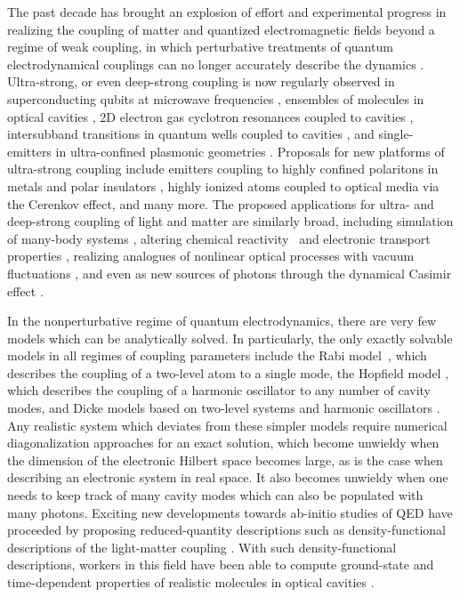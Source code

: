 \documentclass[aps,prl,twocolumn,
	groupedaddress,superscriptaddress,
	amsfonts,amssymb,amsmath,floatfix,
	citeautoscript]{revtex4-1}
\begin{document}
The past decade has brought an explosion of effort and experimental progress in realizing the coupling of matter and quantized electromagnetic fields beyond a regime of weak coupling, in which perturbative treatments of quantum electrodynamical couplings can no longer accurately describe the dynamics \cite{flick7strong,ruggenthaler2017b,forn2018ultrastrong,kockum2018ultrastrong}. Ultra-strong, or even deep-strong coupling is now regularly observed in superconducting qubits at microwave frequencies \cite{blais2004,wallraff2004,yoshihara2017superconducting,forn2017ultrastrong}, ensembles of molecules in optical cavities \cite{hutchison2012,hutchison2013,coles2014,coles2014b,shalabney2015coherent, thomas2016,ebbesen2016}, 2D electron gas cyclotron resonances coupled to cavities \cite{hagenmuller2010ultrastrong,scalari2012ultrastrong,zhang2016collective}, intersubband transitions in quantum wells coupled to cavities \cite{todorov2010ultrastrong,geiser2012ultrastrong}, and single-emitters in ultra-confined plasmonic geometries \cite{benz2016,chikkaraddy2016}. Proposals for new platforms of ultra-strong coupling include emitters coupling to highly confined polaritons in metals and polar insulators \cite{rivera2016shrinking}, highly ionized atoms coupled to optical media via the Cerenkov effect, and many more. The proposed applications for ultra- and deep-strong coupling of light and matter are similarly broad, including simulation of many-body systems \cite{forn2018ultrastrong}, altering chemical reactivity~\cite{hutchison2012, thomas2016,flick2017} and electronic transport properties \cite{orgiu2015}, realizing analogues of nonlinear optical processes with vacuum fluctuations \cite{kockum2017deterministic}, and even as new sources of photons through the dynamical Casimir effect \cite{ciuti2005quantum}.

In the nonperturbative regime of quantum electrodynamics, there are very few models which can be analytically solved. In particularly, the only exactly solvable models in all regimes of coupling parameters include the Rabi model~\cite{braak2011}, which describes the coupling of a two-level atom to a single mode, the Hopfield model \cite{hopfield1958theory}, which describes the coupling of a harmonic oscillator to any number of cavity modes, and Dicke models based on two-level systems and harmonic oscillators \cite{dicke1954coherence}. Any realistic system which deviates from these simpler models require numerical diagonalization approaches for an exact solution, which become unwieldy when the dimension of the electronic Hilbert space becomes large, as is the case when describing an electronic system in real space. It also becomes unwieldy when one needs to keep track of many cavity modes which can also be populated with many photons. Exciting new developments towards ab-initio studies of QED have proceeded by proposing reduced-quantity descriptions such as density-functional descriptions of the light-matter coupling \cite{ruggenthaler2014,pellegrini2015,flick2015,dimitrov2017,flick2018,flick2018b,schaefer2018}. With such density-functional descriptions, workers in this field have been able to compute ground-state and time-dependent properties of realistic molecules in optical cavities \cite{flick2017c}. 
\end{document}
